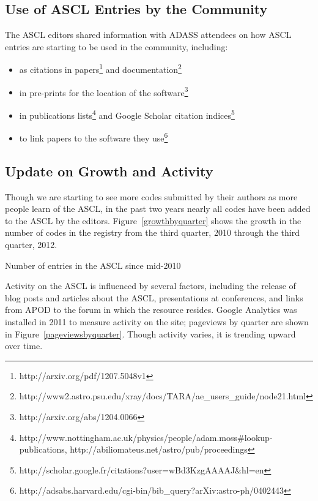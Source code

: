 \subsection{Use of ASCL Entries by the Community}
The ASCL editors shared information with ADASS attendees on how ASCL entries are starting to be used in the community, including: 
\begin{itemize}

\item as citations in papers\footnote{http://arxiv.org/pdf/1207.5048v1} and documentation\footnote{http://www2.astro.psu.edu/xray/docs/TARA/ae\_users\_guide/node21.html}

\item in pre-prints for the location of the software\footnote{http://arxiv.org/abs/1204.0066}

\item in publications lists\footnote{http://www.nottingham.ac.uk/physics/people/adam.moss\#lookup-publications, http://abiliomateus.net/astro/pub/proceedings} and Google Scholar citation indices\footnote{http://scholar.google.fr/citations?user=wBd3KzgAAAAJ\&hl=en}

\item to link papers to the software they use\footnote{http://adsabs.harvard.edu/cgi-bin/bib\_query?arXiv:astro-ph/0402443}

\end{itemize}

\subsection{Update on Growth and Activity}
Though we are starting to see more codes submitted by their authors as more people learn of the ASCL, in the past two years nearly all codes have been added to the ASCL by the editors. Figure~\ref{growthbyquarter} shows the growth in the number of codes in the registry from the third quarter, 2010 through the third quarter, 2012.

{Number of entries in the ASCL since mid-2010}

Activity on the ASCL is influenced by several factors, including the release of blog posts and articles about the ASCL, presentations at conferences, and links from APOD to the forum in which the resource resides. Google Analytics was installed in 2011 to measure activity on the site; pageviews by quarter are shown in Figure~\ref{pageviewsbyquarter}. Though activity varies, it is trending upward over time. 

